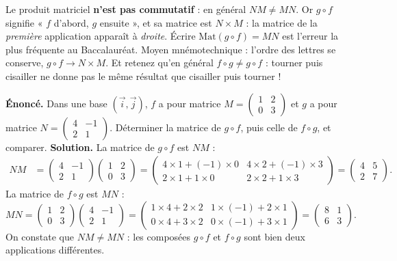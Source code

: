 \documentclass[11pt]{article}
\begin{document}
\begin{attention}
Le produit matriciel \textbf{n'est pas commutatif} : en général $NM \neq MN$. Or $g \circ f$ signifie « $f$ d'abord, $g$ ensuite », et sa matrice est $N \times M$ : la matrice de la \emph{première} application apparaît à \emph{droite}. Écrire $\mathrm{Mat}(g\circ f) = MN$ est l'erreur la plus fréquente au Baccalauréat. Moyen mnémotechnique : l'ordre des lettres se conserve, $g \circ f \longrightarrow N \times M$. Et retenez qu'en général $f \circ g \neq g \circ f$ : tourner puis cisailler ne donne pas le même résultat que cisailler puis tourner !
\end{attention}

\begin{exoresolu}
\textbf{Énoncé.} Dans une base $(\vec{i},\vec{j})$, $f$ a pour matrice $M = \begin{pmatrix} 1 & 2 \\ 0 & 3 \end{pmatrix}$ et $g$ a pour matrice $N = \begin{pmatrix} 4 & -1 \\ 2 & 1 \end{pmatrix}$. Déterminer la matrice de $g \circ f$, puis celle de $f \circ g$, et comparer.
\tcblower
\textbf{Solution.} La matrice de $g \circ f$ est $NM$ :
\begin{align*}
NM &= \begin{pmatrix} 4 & -1 \\ 2 & 1 \end{pmatrix}\begin{pmatrix} 1 & 2 \\ 0 & 3 \end{pmatrix}
= \begin{pmatrix} 4\times 1 + (-1)\times 0 & 4\times 2 + (-1)\times 3 \\ 2\times 1 + 1\times 0 & 2\times 2 + 1\times 3 \end{pmatrix}
= \begin{pmatrix} 4 & 5 \\ 2 & 7 \end{pmatrix}.
\end{align*}
La matrice de $f \circ g$ est $MN$ :
\[ MN = \begin{pmatrix} 1 & 2 \\ 0 & 3 \end{pmatrix}\begin{pmatrix} 4 & -1 \\ 2 & 1 \end{pmatrix} = \begin{pmatrix} 1\times 4 + 2\times 2 & 1\times(-1) + 2\times 1 \\ 0\times 4 + 3\times 2 & 0\times(-1) + 3\times 1 \end{pmatrix} = \begin{pmatrix} 8 & 1 \\ 6 & 3 \end{pmatrix}. \]
On constate que $NM \neq MN$ : les composées $g\circ f$ et $f\circ g$ sont bien deux applications différentes.
\end{exoresolu}
\end{document}
